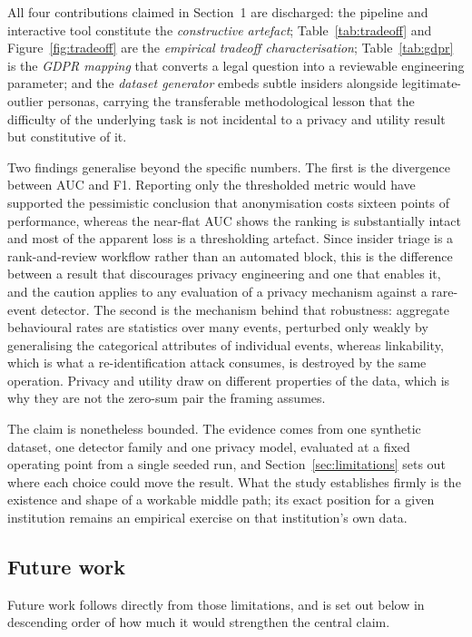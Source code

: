 \documentclass[10pt,a4paper]{article}
\begin{document}
All four contributions claimed in Section~1 are discharged: the pipeline and interactive tool constitute the \emph{constructive artefact}; Table~\ref{tab:tradeoff} and Figure~\ref{fig:tradeoff} are the \emph{empirical tradeoff characterisation}; Table~\ref{tab:gdpr} is the \emph{GDPR mapping} that converts a legal question into a reviewable engineering parameter; and the \emph{dataset generator} embeds subtle insiders alongside legitimate-outlier personas, carrying the transferable methodological lesson that the difficulty of the underlying task is not incidental to a privacy and utility result but constitutive of it.

Two findings generalise beyond the specific numbers. The first is the divergence between AUC and F1. Reporting only the thresholded metric would have supported the pessimistic conclusion that anonymisation costs sixteen points of performance, whereas the near-flat AUC shows the ranking is substantially intact and most of the apparent loss is a thresholding artefact. Since insider triage is a rank-and-review workflow rather than an automated block, this is the difference between a result that discourages privacy engineering and one that enables it, and the caution applies to any evaluation of a privacy mechanism against a rare-event detector. The second is the mechanism behind that robustness: aggregate behavioural rates are statistics over many events, perturbed only weakly by generalising the categorical attributes of individual events, whereas linkability, which is what a re-identification attack consumes, is destroyed by the same operation. Privacy and utility draw on different properties of the data, which is why they are not the zero-sum pair the framing assumes.

The claim is nonetheless bounded. The evidence comes from one synthetic dataset, one detector family and one privacy model, evaluated at a fixed operating point from a single seeded run, and Section~\ref{sec:limitations} sets out where each choice could move the result. What the study establishes firmly is the existence and shape of a workable middle path; its exact position for a given institution remains an empirical exercise on that institution's own data.

\subsection{Future work}
Future work follows directly from those limitations, and is set out below in descending order of how much it would strengthen the central claim.
\end{document}

